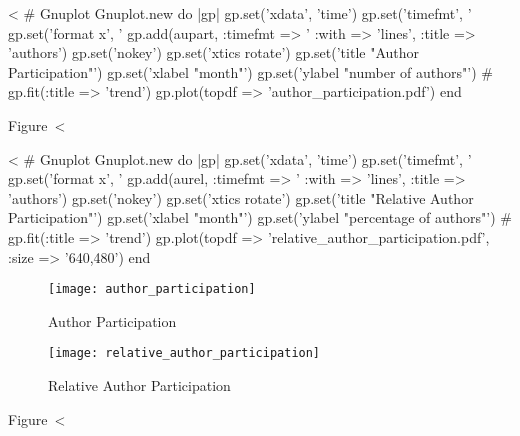 \documentclass{scrartcl}
\begin{document}
<%
# Gnuplot
Gnuplot.new do |gp|
	gp.set('xdata', 'time')
	gp.set('timefmt', '%
	gp.set('format x', '%
	gp.add(aupart, :timefmt => '%
		:with => 'lines',
		:title => 'authors')
	gp.set('nokey')
	gp.set('xtics rotate')
	gp.set('title "Author Participation"')
	gp.set('xlabel "month"')
	gp.set('ylabel "number of authors"')
#	gp.fit(:title => 'trend')
	gp.plot(topdf => 'author_participation.pdf')
end

Figure~<%

<%
# Gnuplot
Gnuplot.new do |gp|
	gp.set('xdata', 'time')
	gp.set('timefmt', '%
	gp.set('format x', '%
	gp.add(aurel, :timefmt => '%
		:with => 'lines',
		:title => 'authors')
	gp.set('nokey')
	gp.set('xtics rotate')
	gp.set('title "Relative Author Participation"')
	gp.set('xlabel "month"')
	gp.set('ylabel "percentage of authors"')
#	gp.fit(:title => 'trend')
	gp.plot(topdf => 'relative_author_participation.pdf', :size => '640,480')
end

\begin{figure}[htbp]
  \parbox[t]{0.48\textwidth}{        
    \texttt{[image: author\_participation]}
    \caption{Author Participation}
    \label{fig:author_participation}}
  \hfill
  \parbox[t]{0.48\textwidth}{        
    \texttt{[image: relative\_author\_participation]}
    \caption{Relative Author Participation}
    \label{fig:relative_author_participation}}
\end{figure}

Figure~<%

\end{document}

